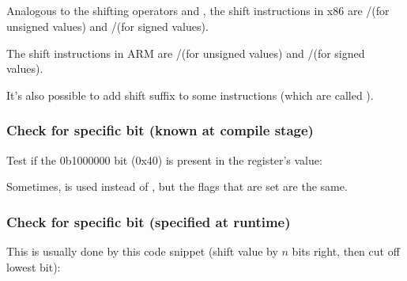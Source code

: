 ﻿%
\subsection{\Conclusion{}}


Analogous to the \CCpp shifting operators \TT{$\ll$} and \TT{$\gg$},
the shift instructions in x86 are \SHR/\SHL (for unsigned values) and \SAR/\SHL (for signed values).


The shift instructions in ARM are \LSR/\LSL (for unsigned values) and \ASR/\LSL (for signed values).

It's also possible to add shift suffix to some instructions 
(which are called ).

\subsubsection{Check for specific bit (known at compile stage)}

Test if the 0b1000000 bit (0x40) is present in the register's value:










Sometimes, \AND is used instead of \TEST, but the flags that are set are the same.

\subsubsection{Check for specific bit (specified at runtime)}

This is usually done by this \CCpp code snippet (shift value by $n$ bits right, then cut off lowest bit):



